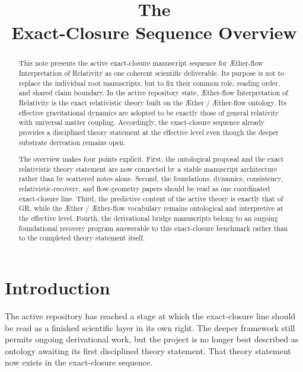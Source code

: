 \documentclass[11pt]{article}
\title{\textbf{The \TheoryName{}}\\[0.4em]
\large Exact-Closure Sequence Overview}
\author{}
\date{}
\newcommand{\Aether}{\AE{}ther}
\newcommand{\Aflow}{\AE{}ther-flow}
\newcommand{\TheoryName}{\Aflow{} Interpretation of Relativity}
\begin{document}
\maketitle

\begin{abstract}
This note presents the active exact-closure manuscript sequence for \TheoryName{} as one coherent scientific deliverable. Its purpose is not to replace the individual root manuscripts, but to fix their common role, reading order, and shared claim boundary. In the active repository state, \TheoryName{} is the exact relativistic theory built on the \Aether{} / \Aflow{} ontology. Its effective gravitational dynamics are adopted to be exactly those of general relativity with universal matter coupling. Accordingly, the exact-closure sequence already provides a disciplined theory statement at the effective level even though the deeper substrate derivation remains open.

The overview makes four points explicit. First, the ontological proposal and the exact relativistic theory statement are now connected by a stable manuscript architecture rather than by scattered notes alone. Second, the foundations, dynamics, consistency, relativistic-recovery, and flow-geometry papers should be read as one coordinated exact-closure line. Third, the predictive content of the active theory is exactly that of GR, while the \Aether{} / \Aflow{} vocabulary remains ontological and interpretive at the effective level. Fourth, the derivational bridge manuscripts belong to an ongoing foundational recovery program answerable to this exact-closure benchmark rather than to the completed theory statement itself.
\end{abstract}

\section{Introduction}

The active repository has reached a stage at which the exact-closure line should be read as a finished scientific layer in its own right. The deeper framework still permits ongoing derivational work, but the project is no longer best described as ontology awaiting its first disciplined theory statement. That theory statement now exists in the exact-closure sequence.
\end{document}
